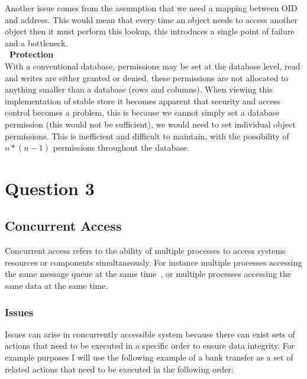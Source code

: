 \documentclass[a4paper,12pt]{article}
\begin{document}
Another issue comes from the assumption that we need a mapping between OID and address.
This would mean that every time an object needs to access another object then it must perform this lookup, this introduces a single point of failure and a bottleneck.
\\\textbf{\indent~Protection}\\
With a conventional database, permissions may be set at the database level, read and writes are either granted or denied, these permissions are not allocated to anything smaller than a database (rows and columns).
When viewing this implementation of stable store it becomes apparent that security and access control becomes a problem, this is because we cannot simply set a database permission (this would not be sufficient), we would need to set individual object permissions.
This is inefficient and difficult to maintain, with the possibility of $n*(n-1)$ permissions throughout the database.





\section*{Question 3}

\subsection*{Concurrent Access}
Concurrent access refers to the ability of multiple processes to access systems resources or components simultaneously. 
For instance multiple processes accessing the same message queue at the same time~\citep{managing-concurrent-access}, or multiple processes accessing the same data at the same time.
\subsubsection*{Issues}
Issues can arise in concurrently accessible system because there can exist sets of actions that need to be executed in a specific order to ensure data integrity.
For example purposes I will use the following example of a bank transfer as a set of related actions that need to be executed in the following order:
\end{document}
